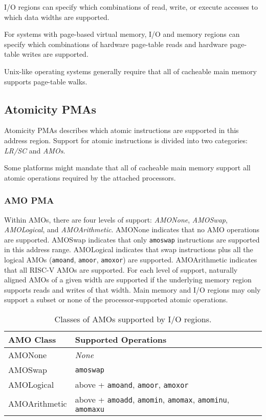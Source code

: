 I/O regions can specify which combinations of read, write, or execute
accesses to which data widths are supported.

For systems with page-based virtual memory, I/O and memory regions can
specify which combinations of hardware page-table reads and hardware
page-table writes are supported.

\begin{commentary}
Unix-like operating systems generally require that all of cacheable main
memory supports page-table walks.
\end{commentary}

\subsection{Atomicity PMAs}

Atomicity PMAs describes which atomic instructions are supported in
this address region.
Support for atomic instructions is divided into two
categories: {\em LR/SC} and {\em AMOs}.

\begin{commentary}
Some platforms might mandate that all of cacheable main memory support
all atomic operations required by the attached processors.
\end{commentary}

\subsubsection{AMO PMA}

  Within AMOs, there are four levels of
support: {\em AMONone}, {\em AMOSwap}, {\em AMOLogical}, and {\em
  AMOArithmetic}.  AMONone indicates that no AMO operations are
supported.  AMOSwap indicates that only {\tt amoswap} instructions are
supported in this address range.  AMOLogical indicates that swap
instructions plus all the logical AMOs ({\tt amoand}, {\tt amoor},
{\tt amoxor}) are supported.  AMOArithmetic indicates that all RISC-V
AMOs are supported.  For each level of support, naturally aligned AMOs
of a given width are supported if the underlying memory region
supports reads and writes of that width.
Main memory and I/O regions may only support a subset or none of the
processor-supported atomic operations.

\begin{table*}[h!]
\begin{center}
\begin{tabular}{|l|l|}
  \hline
  AMO Class & Supported Operations \\
  \hline
  AMONone       & {\em None} \\
  AMOSwap       & {\tt amoswap} \\
  AMOLogical    & above + {\tt amoand}, {\tt amoor}, {\tt amoxor} \\
  AMOArithmetic & above + {\tt amoadd}, {\tt amomin}, {\tt amomax}, {\tt amominu}, {\tt amomaxu} \\
  \hline
\end{tabular}
\end{center}
\caption{Classes of AMOs supported by I/O regions.}
\label{amoclasses}
\end{table*}

